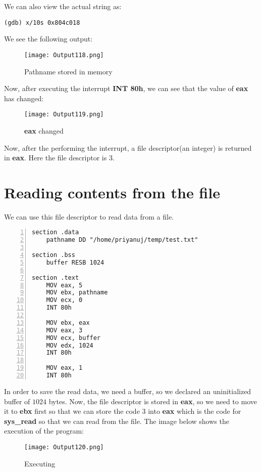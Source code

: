 \documentclass{article}
\makeatletter
\renewcommand\paragraph{\@startsection{paragraph}{4}{\z@}{-3.25ex \@plus -1ex \@minus -.2ex}{1.5ex \@plus .2ex}{\normalfont\normalsize\bfseries}}
\makeatother
\begin{document}
We can also view the actual string as:
\begin{Verbatim}[frame=single]
(gdb) x/10s 0x804c018
\end{Verbatim}
We see the following output:
\begin{figure}[h]
	\centering
	\texttt{[image: Output118.png]}
	\caption{Pathname stored in memory}
	\label{fig:fig4}
\end{figure}
\newpage
Now, after executing the interrupt \textbf{INT 80h}, we can see that the value of \textbf{eax} has changed:
\begin{figure}[h]
	\centering
	\texttt{[image: Output119.png]}
	\caption{\textbf{eax} changed}
	\label{fig:fig5}
\end{figure}

Now, after the performing the interrupt, a file descriptor(an integer) is returned in \textbf{eax}. Here the file descriptor is $3$.

\newpage
\section{Reading contents from the file}\label{sec:sec2}
\paragraph{}
We can use this file descriptor to read data from a file.
\begin{lstlisting}[frame=single, numbers=left, breaklines=true]
section .data
	pathname DD "/home/priyanuj/temp/test.txt"

section .bss
	buffer RESB 1024

section .text
	MOV eax, 5
	MOV ebx, pathname
	MOV ecx, 0
	INT 80h
	
	MOV ebx, eax
	MOV eax, 3
	MOV ecx, buffer
	MOV edx, 1024
	INT 80h
	
	MOV eax, 1
	INT 80h
\end{lstlisting}
In order to save the read data, we need a buffer, so we declared an uninitialized buffer of $1024$ bytes. Now, the file descriptor is stored in \textbf{eax}, so we need to move it to \textbf{ebx} first so that we can store the code $3$ into \textbf{eax} which is the code for \textbf{sys\_read} so that we can read from the file.
\newpage
The image below shows the execution of the program:
\begin{figure}[h]
	\centering
	\texttt{[image: Output120.png]}
	\caption{Executing}
	\label{fig:fig6}
\end{figure}
\end{document}
